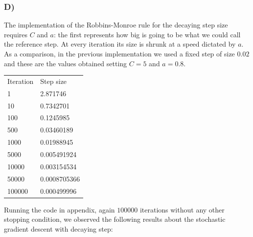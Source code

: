\documentclass{article}
\begin{document}
\subsubsection*{D)}

The implementation of the Robbins-Monroe rule for the decaying step size requires $C$ and $a$: the first represents how big is going to be what we could call the reference step. At every iteration its size is shrunk at a speed dictated by $a$. As a comparison, in the previous implementation we used a fixed step of size $0.02$ and these are the values obtained setting $C=5$ and $a=0.8$.

\begin{center}
\begin{tabular}{ll}
Iteration  &Step size\\
1          &2.871746\\
10         &0.7342701\\
100        &0.1245985\\
500        &0.03460189\\
1000       &0.01988945\\
5000       &0.005491924\\
10000      &0.003154534\\
50000      &0.0008705366\\
100000     &0.000499996
\end{tabular}
\end{center}

Running the code in appendix, again $100000$ iterations without any other stopping condition, we observed the following results about the stochastic gradient descent with decaying step:
\end{document}
